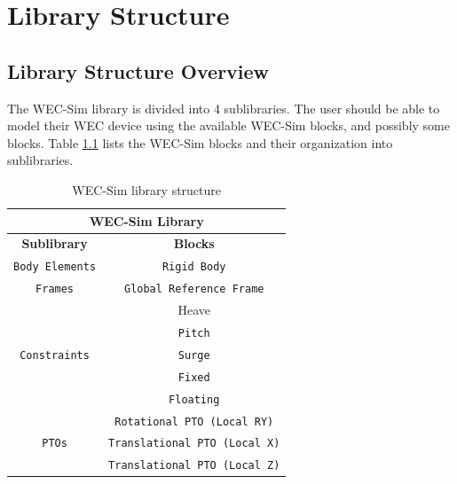   	
\chapter{Library Structure} 
    \section{Library Structure Overview}
    The WEC-Sim library is divided into 4 sublibraries. The user
    should be able to model their WEC device using the available WEC-Sim blocks, 
	and possibly some \simmechanics blocks. Table \ref{tab:libStruct} lists the WEC-Sim 
	blocks and their organization into sublibraries.
	
         \begin{table}[htbp]
          \centering
          \caption{WEC-Sim library structure}
            \begin{tabular}{c|c}
            \toprule
            \multicolumn{2}{c}{\textbf{WEC-Sim Library}} \\
            \midrule
            \textbf{Sublibrary} & \textbf{Blocks} \\
            \midrule
            \multirow{1}[2]{*}{\texttt{Body Elements}} & \texttt{Rigid Body} \\
            \midrule
            \multirow{1}[2]{*}{\texttt{Frames}} & \texttt{Global Reference 
			Frame} \\
            \midrule
            \multirow{5}[2]{*}{\texttt{Constraints}} & Heave \\
                  & \texttt{Pitch} \\
                  & \texttt{Surge} \\
                  & \texttt{Fixed} \\
                  & \texttt{Floating} \\
            \midrule
            \multirow{3}[2]{*}{\texttt{PTOs}} & \texttt{Rotational PTO 
			(Local RY)} \\
                  & \texttt{Translational PTO (Local X)} \\
                  & \texttt{Translational PTO (Local Z)} \\
            \bottomrule
            \end{tabular}
          \label{tab:libStruct}
        \end{table}
		
